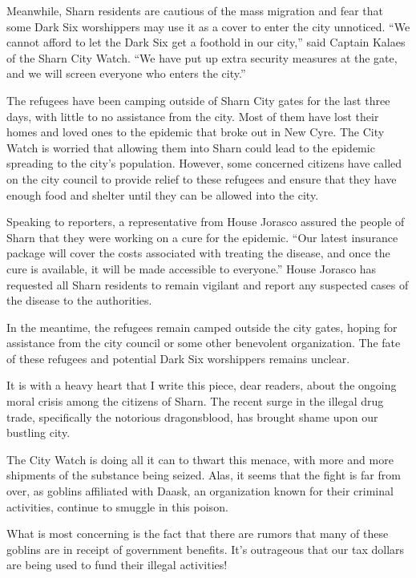 \documentclass{article}
\begin{document}
\begin{multicols}{3}
Meanwhile, Sharn residents are cautious of the mass migration and fear that some Dark Six worshippers may use it as a cover to enter the city unnoticed. ``We cannot afford to let the Dark Six get a foothold in our city,'' said Captain Kalaes of the Sharn City Watch. ``We have put up extra security measures at the gate, and we will screen everyone who enters the city.''

The refugees have been camping outside of Sharn City gates for the last three days, with little to no assistance from the city. Most of them have lost their homes and loved ones to the epidemic that broke out in New Cyre. The City Watch is worried that allowing them into Sharn could lead to the epidemic spreading to the city's population. However, some concerned citizens have called on the city council to provide relief to these refugees and ensure that they have enough food and shelter until they can be allowed into the city.

Speaking to reporters, a representative from House Jorasco assured the people of Sharn that they were working on a cure for the epidemic. ``Our latest insurance package will cover the costs associated with treating the disease, and once the cure is available, it will be made accessible to everyone.'' House Jorasco has requested all Sharn residents to remain vigilant and report any suspected cases of the disease to the authorities.

In the meantime, the refugees remain camped outside the city gates, hoping for assistance from the city council or some other benevolent organization. The fate of these refugees and potential Dark Six worshippers remains unclear.

    \closearticle

            

It is with a heavy heart that I write this piece, dear readers, about the ongoing moral crisis among the citizens of Sharn. The recent surge in the illegal drug trade, specifically the notorious dragonsblood, has brought shame upon our bustling city.

The City Watch is doing all it can to thwart this menace, with more and more shipments of the substance being seized. Alas, it seems that the fight is far from over, as goblins affiliated with Daask, an organization known for their criminal activities, continue to smuggle in this poison.

What is most concerning is the fact that there are rumors that many of these goblins are in receipt of government benefits. It's outrageous that our tax dollars are being used to fund their illegal activities!


\end{multicols}
\end{document}
